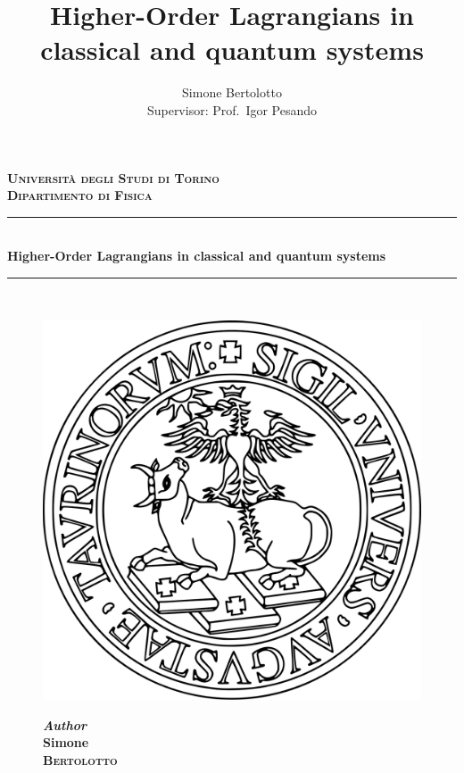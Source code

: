 \documentclass[a4paper]{article}
\title{Higher-Order Lagrangians in classical and quantum systems}
\author{Simone Bertolotto\\[1.0em]{\small Supervisor: Prof.\ Igor Pesando}}
\theoremstyle{definition}
\numberwithin{equation}{section}
\begin{document}
  \begin{titlepage}
  \newcommand{\HRule}{\rule{\linewidth}{0.5mm}}

  \center
  \textsc{\textbf{\LARGE Università degli Studi di Torino}}\\[0.5cm]
  \textsc{\textbf{\Large Dipartimento di Fisica }}\\[1cm]


  \HRule\\[0.4cm]
  {\Large\bfseries Higher-Order Lagrangians in classical and quantum systems}
  \\[0.1cm] %
  \HRule\\[0.4cm]

  \vfill
  \begin{figure}[h]
  \centering
  \includegraphics[scale=0.15]{logo.png}
  \end{figure}
  \vfill

  \begin{figure}[h]
  \centering
  \begin{minipage}{0.4\textwidth}

  \Large
  \textbf{\textit{Author}\\
    Simone\\ \textsc{Bertolotto}} %

  \end{minipage}
  \qquad \qquad \qquad
  \begin{minipage}{0.4\textwidth}


\end{minipage}
\end{figure}
\end{titlepage}
\end{document}

